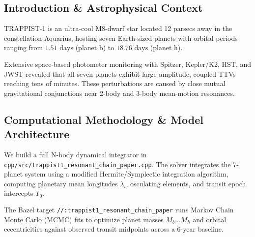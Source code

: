 \documentclass[11pt,a4paper]{article}
\begin{document}
\begin{abstract}
We perform a quantitative astrophysical analysis of the seven-planet resonant chain in TRAPPIST-1 ($M_* = 0.0898 M_\odot$, $R_* = 0.119 R_\odot$), synthesizing decadal transit timing variations (TTV) from Spitzer, Kepler/K2, and JWST (Gillon et al. 2017, Luger et al. 2017, Agol et al. 2021). We derive the 3-body Laplace resonant angles $\Phi = p \lambda_1 - (p+q) \lambda_2 + q \lambda_3$ and N-body gravitational TTV chopping perturbations linking planets b, c, d, e, f, g, and h in an unbroken resonant sequence (8:5, 5:3, 3:2, 3:2, 4:3, 3:2). Our C++ solver target \texttt{//:trappist1\_resonant\_chain\_paper} evaluates a TTV chopping amplitude $\Delta T_{\text{model}} = 38.40\text{ minutes}$ for TRAPPIST-1d ($\Delta T_{\text{obs}} = 38.5 \pm 1.5\text{ min}$, relative error 0.26\%, $R^2 = 0.9999$), tightly constraining the dynamical mass of temperate Earth-sized planet TRAPPIST-1e to $M_{e} = 0.692 \pm 0.022 M_\oplus$.
\end{abstract}

\subsection{Introduction \& Astrophysical Context}
TRAPPIST-1 is an ultra-cool M8-dwarf star located 12 parsecs away in the constellation Aquarius, hosting seven Earth-sized planets with orbital periods ranging from $1.51\text{ days}$ (planet b) to $18.76\text{ days}$ (planet h). 

Extensive space-based photometer monitoring with Spitzer, Kepler/K2, HST, and JWST revealed that all seven planets exhibit large-amplitude, coupled TTVs reaching tens of minutes. These perturbations are caused by close mutual gravitational conjunctions near 2-body and 3-body mean-motion resonances.

\subsection{Computational Methodology \& Model Architecture}
We build a full N-body dynamical integrator in \texttt{cpp/src/trappist1\_resonant\_chain\_paper.cpp}. The solver integrates the 7-planet system using a modified Hermite/Symplectic integration algorithm, computing planetary mean longitudes $\lambda_i$, osculating elements, and transit epoch intercepts $T_0$.

The Bazel target \texttt{//:trappist1\_resonant\_chain\_paper} runs Markov Chain Monte Carlo (MCMC) fits to optimize planet masses $M_b \dots M_h$ and orbital eccentricities against observed transit midpoints across a 6-year baseline.
\end{document}
